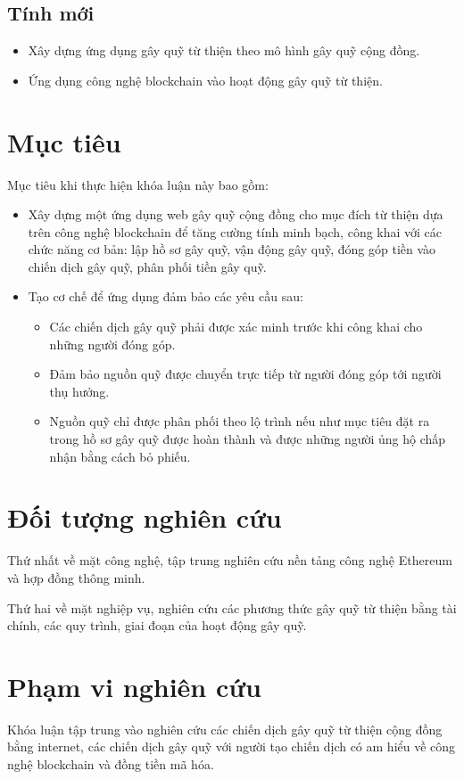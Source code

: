 \documentclass[../main-report.tex]{subfiles}
\begin{document}
\subsection{Tính mới}
\begin{itemize}
\item Xây dựng ứng dụng gây quỹ từ thiện theo mô hình gây quỹ cộng đồng.
\item Ứng dụng công nghệ \gls{blockchain} vào hoạt động gây quỹ từ thiện.
\end{itemize}

\section{Mục tiêu}
Mục tiêu khi thực hiện khóa luận này bao gồm:

\begin{itemize}
\item Xây dựng một ứng dụng web gây quỹ cộng đồng cho mục đích từ thiện dựa trên công nghệ \Gls{blockchain} để tăng cường tính minh bạch, công khai với các chức năng cơ bản: lập hồ sơ gây quỹ, vận động gây quỹ, đóng góp tiền vào chiến dịch gây quỹ, phân phối tiền gây quỹ.
\item Tạo cơ chế để ứng dụng đảm bảo các yêu cầu sau:
\begin{itemize}
\item Các chiến dịch gây quỹ phải được xác minh trước khi công khai cho những người đóng góp.
\item Đảm bảo nguồn quỹ được chuyển trực tiếp từ người đóng góp tới người thụ hưởng.
\item Nguồn quỹ chỉ được phân phối theo lộ trình nếu như mục tiêu đặt ra trong hồ sơ gây quỹ được hoàn thành và được những người ủng hộ chấp nhận bằng cách bỏ phiếu.
\end{itemize}
\end{itemize}

\section{Đối tượng nghiên cứu}
Thứ nhất về mặt công nghệ, tập trung nghiên cứu nền tảng công nghệ Ethereum và hợp đồng thông minh.

Thứ hai về mặt nghiệp vụ, nghiên cứu các phương thức gây quỹ từ thiện bằng tài chính, các quy trình, giai đoạn của hoạt động gây quỹ.

\section{Phạm vi nghiên cứu}
Khóa luận tập trung vào nghiên cứu các chiến dịch gây quỹ từ thiện cộng đồng bằng internet, các chiến dịch gây quỹ với người tạo chiến dịch có am hiểu về công nghệ blockchain và đồng tiền mã hóa.
\end{document}
